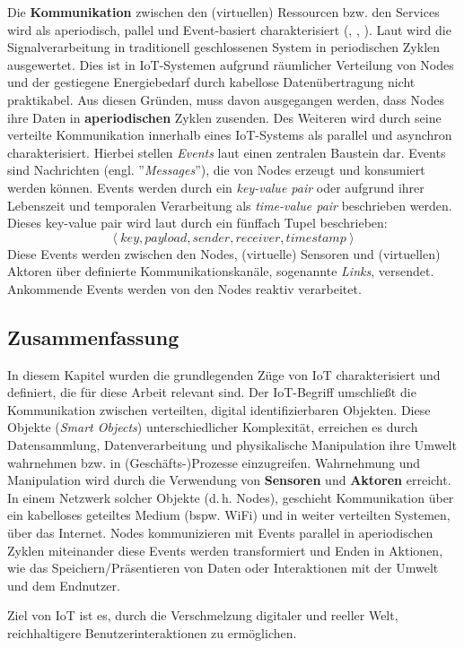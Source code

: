 Die \textbf{Kommunikation} zwischen den (virtuellen) Ressourcen bzw. den Services wird als aperiodisch, pallel und Event-basiert charakterisiert (\cite{serpanos2018iot}, \cite{laliwala2008event}, \cite{lan2014event}). Laut \cite{serpanos2018iot} wird die Signalverarbeitung in traditionell geschlossenen System in periodischen Zyklen ausgewertet. Dies ist in \ac{IoT}-Systemen aufgrund räumlicher Verteilung von Nodes und der gestiegene Energiebedarf durch kabellose Datenübertragung nicht praktikabel. Aus diesen Gründen, muss davon ausgegangen werden, dass Nodes ihre Daten in \textbf{aperiodischen} Zyklen zusenden. Des Weiteren wird durch seine verteilte Kommunikation innerhalb eines \ac{IoT}-Systems als parallel und asynchron charakterisiert. Hierbei stellen \textit{Events} laut \cite{serpanos2018iot} einen zentralen Baustein dar. Events sind Nachrichten (engl. ''\textit{Messages}''), die von Nodes erzeugt und konsumiert werden können. Events werden durch ein \textit{key-value pair} oder aufgrund ihrer Lebenszeit und temporalen Verarbeitung als \textit{time-value pair} beschrieben werden. Dieses key-value pair wird laut \cite{serpanos2018iot} durch ein fünffach Tupel beschrieben:
\begin{equation}
    \left \langle key, payload, sender, receiver, timestamp \right \rangle
\end{equation}
Diese Events werden zwischen den Nodes, (virtuelle) Sensoren und (virtuellen) Aktoren über definierte Kommunikationskanäle, sogenannte \textit{Links}, versendet. Ankommende Events werden von den Nodes reaktiv verarbeitet.

\subsection{Zusammenfassung}
In diesem Kapitel wurden die grundlegenden Züge von \ac{IoT} charakterisiert und definiert, die für diese Arbeit relevant sind. Der \ac{IoT}-Begriff umschließt die Kommunikation zwischen verteilten, digital identifizierbaren Objekten. Diese Objekte (\textit{Smart Objects}) unterschiedlicher Komplexität, erreichen es durch Datensammlung, Datenverarbeitung und physikalische Manipulation ihre Umwelt wahrnehmen bzw. in (Geschäfts-)Prozesse einzugreifen. Wahrnehmung und Manipulation wird durch die Verwendung von \textbf{Sensoren} und \textbf{Aktoren} erreicht. In einem Netzwerk solcher Objekte (d.\,h. Nodes), geschieht Kommunikation über ein kabelloses geteiltes Medium (bspw. WiFi) und in weiter verteilten Systemen, über das Internet. Nodes kommunizieren mit Events parallel in aperiodischen Zyklen miteinander diese Events werden transformiert und Enden in Aktionen, wie das Speichern/Präsentieren von Daten oder Interaktionen mit der Umwelt und dem Endnutzer.

Ziel von \ac{IoT} ist es, durch die Verschmelzung digitaler und reeller Welt, reichhaltigere Benutzerinteraktionen zu ermöglichen.